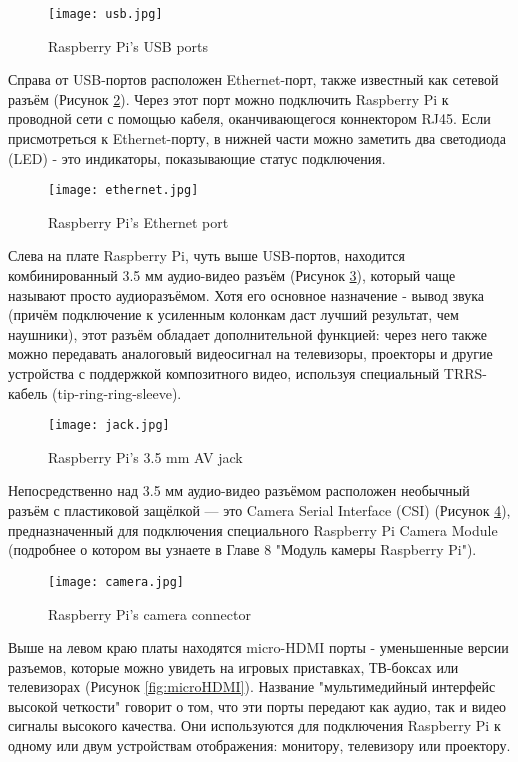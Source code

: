 \begin{figure}[H]
	\centering
	\texttt{[image: usb.jpg]}
	\caption{Raspberry Pi’s USB ports}
	\label{fig:usb}
\end{figure}

Справа от USB-портов расположен Ethernet-порт, также известный как сетевой разъём (Рисунок \ref{fig:ethernet}). Через этот порт можно подключить Raspberry Pi к проводной сети с помощью кабеля, оканчивающегося коннектором RJ45. Если присмотреться к Ethernet-порту, в нижней части можно заметить два светодиода (LED) - это индикаторы, показывающие статус подключения.

\begin{figure}[H]
	\centering
	\texttt{[image: ethernet.jpg]}
	\caption{Raspberry Pi’s Ethernet port}
	\label{fig:ethernet}
\end{figure}

Слева на плате Raspberry Pi, чуть выше USB-портов, находится комбинированный 3.5 мм аудио-видео разъём (Рисунок \ref{fig:jack}), который чаще называют просто аудиоразъёмом. Хотя его основное назначение - вывод звука (причём подключение к усиленным колонкам даст лучший результат, чем наушники), этот разъём обладает дополнительной функцией: через него также можно передавать аналоговый видеосигнал на телевизоры, проекторы и другие устройства с поддержкой композитного видео, используя специальный TRRS-кабель (tip-ring-ring-sleeve).

\begin{figure}[H]
	\centering
	\texttt{[image: jack.jpg]}
	\caption{Raspberry Pi’s 3.5 mm AV jack}
	\label{fig:jack}
\end{figure}

Непосредственно над 3.5 мм аудио-видео разъёмом расположен необычный разъём с пластиковой защёлкой — это Camera Serial Interface (CSI) (Рисунок \ref{fig:camera}), предназначенный для подключения специального Raspberry Pi Camera Module (подробнее о котором вы узнаете в Главе 8 "Модуль камеры Raspberry Pi").

\begin{figure}[H]
	\centering
	\texttt{[image: camera.jpg]}
	\caption{Raspberry Pi’s camera connector}
	\label{fig:camera}
\end{figure}

Выше на левом краю платы находятся micro-HDMI порты - уменьшенные версии разъемов, которые можно увидеть на игровых приставках, ТВ-боксах или телевизорах (Рисунок \ref{fig:microHDMI}). Название "мультимедийный интерфейс высокой четкости" говорит о том, что эти порты передают как аудио, так и видео сигналы высокого качества. Они используются для подключения Raspberry Pi к одному или двум устройствам отображения: монитору, телевизору или проектору.

